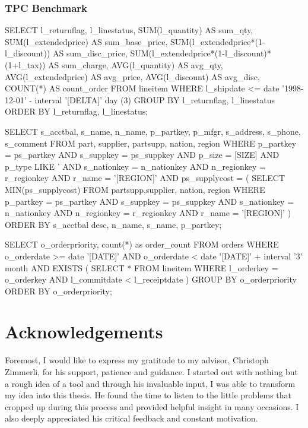 \documentclass[11pt,a4paper]{globis-book}
\begin{document}
\subsection*{TPC Benchmark}
\begin{setq}
SELECT
  l_returnflag,
  l_linestatus,
  SUM(l_quantity) AS sum_qty,
  SUM(l_extendedprice) AS sum_base_price,
  SUM(l_extendedprice*(1-l_discount)) AS sum_disc_price,
  SUM(l_extendedprice*(1-l_discount)*(1+l_tax)) AS sum_charge,
  AVG(l_quantity) AS avg_qty, 
  AVG(l_extendedprice) AS avg_price,
  AVG(l_discount) AS avg_disc, 
  COUNT(*) AS count_order
FROM 
  lineitem
WHERE 
  l_shipdate <= date '1998-12-01' - interval '[DELTA]' day (3)
GROUP BY
  l_returnflag, 
  l_linestatus
ORDER BY
  l_returnflag, 
  l_linestatus;
\end{setq}
\begin{setq}
SELECT
  s_acctbal,
  s_name,
  n_name,
  p_partkey,
  p_mfgr,
  s_address,
  s_phone,
  s_comment
FROM
  part, supplier, partsupp, nation, region
WHERE
  p_partkey = ps_partkey
  AND s_suppkey = ps_suppkey
  AND p_size = [SIZE]
  AND p_type LIKE '%
  AND s_nationkey = n_nationkey
  AND n_regionkey = r_regionkey
  AND r_name = '[REGION]'
  AND ps_supplycost = (
    SELECT
      MIN(ps_supplycost)
    FROM 
      partsupp,supplier, nation, region
    WHERE 
      p_partkey = ps_partkey
      AND s_suppkey = ps_suppkey
      AND s_nationkey = n_nationkey
      AND n_regionkey = r_regionkey
      AND r_name = '[REGION]'
  )
ORDER BY
  s_acctbal desc,
  n_name,
  s_name,
  p_partkey;
\end{setq}
\begin{setq}
SELECT
  o_orderpriority, 
  count(*) as order_count
FROM
  orders
WHERE
  o_orderdate >= date '[DATE]' AND
  o_orderdate < date '[DATE]' + interval '3' month AND
  EXISTS (
    SELECT
      *
    FROM
      lineitem
    WHERE
      l_orderkey = o_orderkey AND
      l_commitdate < l_receiptdate
    )
GROUP BY
  o_orderpriority
ORDER BY
  o_orderpriority;
\end{setq}



\listoffigures
\listoftables
\lstlistoflistings

\chapter*{Acknowledgements}
Foremost, I would like to express my gratitude to my advisor, Christoph Zimmerli, for his support, patience and guidance. I started out with nothing but a rough idea of a tool and through his invaluable input, I was able to transform my idea into this thesis. He found the time to listen to the little problems that cropped up during this process and provided helpful insight in many occasions. I also deeply appreciated his critical feedback and constant motivation.
\end{document}
